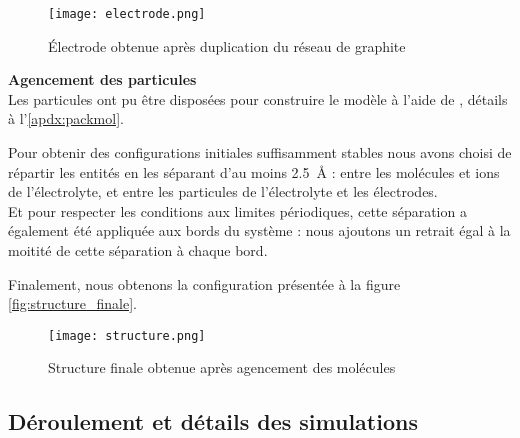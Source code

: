 \begin{figure}[h!]
    \centering
    \texttt{[image: electrode.png]}
    \caption{Électrode obtenue après duplication du réseau de graphite}
    \label{fig:electrode}
\end{figure}

\textbf{Agencement des particules}\\
Les particules ont pu être disposées pour construire le modèle à l'aide de \packmol\cite{martinez_packmol_2009}, détails à l'\autoref{apdx:packmol}.

Pour obtenir des configurations initiales suffisamment stables nous avons choisi de répartir les entités en les séparant d'au moins \qty{2.5}{\angstrom} : entre les molécules et ions de l'électrolyte, et entre les particules de l'électrolyte et les électrodes.\\
Et pour respecter les conditions aux limites périodiques, cette séparation a également été appliquée aux bords du système : nous ajoutons un retrait égal à la moitité de cette séparation à chaque bord.

Finalement, nous obtenons la configuration présentée à la figure \autoref{fig:structure_finale}.

\begin{figure}[h!]
    \centering
    \texttt{[image: structure.png]}
    \caption{Structure finale obtenue après agencement des molécules}
    \label{fig:structure_finale}
\end{figure}

    \subsection{Déroulement et détails des simulations}

